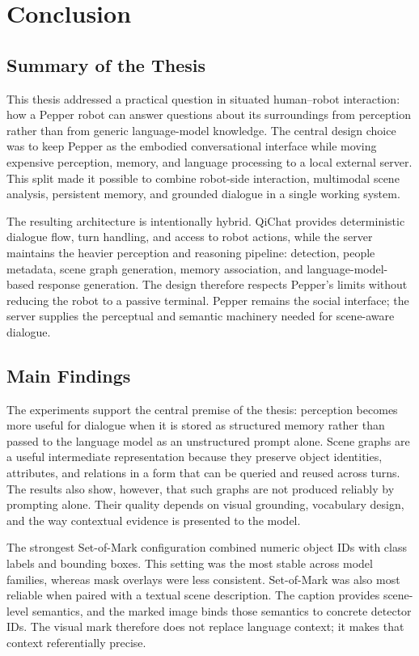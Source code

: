 
\chapter{Conclusion}\label{chap:end}

\section{Summary of the Thesis}
This thesis addressed a practical question in situated human--robot interaction: how a Pepper robot can answer questions about its surroundings from perception rather than from generic language-model knowledge. The central design choice was to keep Pepper as the embodied conversational interface while moving expensive perception, memory, and language processing to a local external server. This split made it possible to combine robot-side interaction, multimodal scene analysis, persistent memory, and grounded dialogue in a single working system.

The resulting architecture is intentionally hybrid. QiChat provides deterministic dialogue flow, turn handling, and access to robot actions, while the server maintains the heavier perception and reasoning pipeline: detection, people metadata, scene graph generation, memory association, and language-model-based response generation. The design therefore respects Pepper's limits without reducing the robot to a passive terminal. Pepper remains the social interface; the server supplies the perceptual and semantic machinery needed for scene-aware dialogue.

\section{Main Findings}
The experiments support the central premise of the thesis: perception becomes more useful for dialogue when it is stored as structured memory rather than passed to the language model as an unstructured prompt alone. Scene graphs are a useful intermediate representation because they preserve object identities, attributes, and relations in a form that can be queried and reused across turns. The results also show, however, that such graphs are not produced reliably by prompting alone. Their quality depends on visual grounding, vocabulary design, and the way contextual evidence is presented to the model.

The strongest Set-of-Mark configuration combined numeric object IDs with class labels and bounding boxes. This setting was the most stable across model families, whereas mask overlays were less consistent. Set-of-Mark was also most reliable when paired with a textual scene description. The caption provides scene-level semantics, and the marked image binds those semantics to concrete detector IDs. The visual mark therefore does not replace language context; it makes that context referentially precise.

